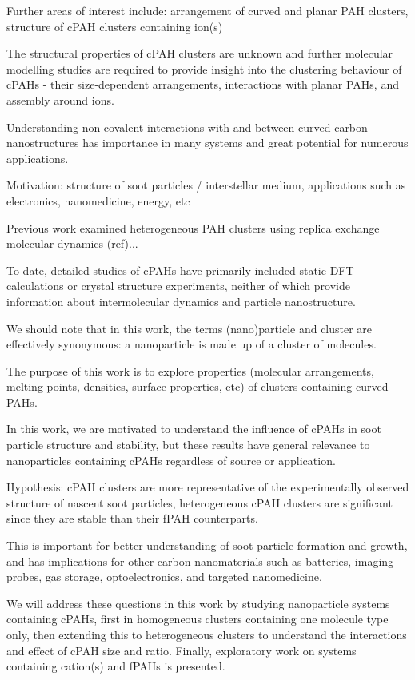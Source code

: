 Further areas of interest include: arrangement of curved and planar PAH clusters, structure of cPAH clusters containing ion(s)

The structural properties of cPAH clusters are unknown and further molecular modelling studies are required to provide insight into the clustering behaviour of cPAHs - their size-dependent arrangements, interactions with planar PAHs, and assembly around ions.

Understanding non-covalent interactions with and between curved carbon nanostructures has importance in many systems and great potential for numerous applications.

Motivation: structure of soot particles / interstellar medium, applications such as electronics, nanomedicine, energy, etc


Previous work examined heterogeneous PAH clusters using replica exchange molecular dynamics (ref)...

To date, detailed studies of cPAHs have primarily included static DFT calculations or crystal structure experiments, neither of which provide information about intermolecular dynamics and particle nanostructure.


We should note that in this work, the terms (nano)particle and cluster are effectively synonymous: a nanoparticle is made up of a cluster of molecules.


The purpose of this work is to explore properties (molecular arrangements, melting points, densities, surface properties, etc) of clusters containing curved PAHs.  

In this work, we are motivated to understand the influence of cPAHs in soot particle structure and stability, but these results have general relevance to nanoparticles containing cPAHs regardless of source or application.

Hypothesis: cPAH clusters are more representative of the experimentally observed structure of nascent soot particles, heterogeneous cPAH clusters are significant since they are stable than their fPAH counterparts.

This is important for better understanding of soot particle formation and growth, and has implications for other carbon nanomaterials such as batteries, imaging probes, gas storage, optoelectronics, and targeted nanomedicine.

We will address these questions in this work by studying nanoparticle systems containing cPAHs, first in homogeneous clusters containing one molecule type only, then extending this to heterogeneous clusters to understand the interactions and effect of cPAH size and ratio. Finally, exploratory work on systems containing cation(s) and fPAHs is presented.

